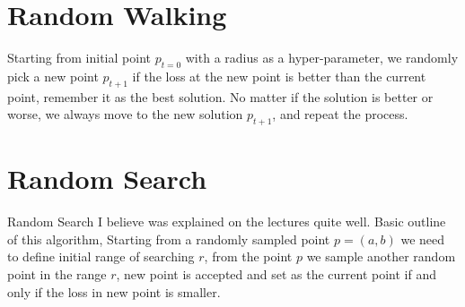 \documentclass{article}
\begin{document}
    \break


    \section{Random Walking}

    Starting from initial point $p_{t=0}$ with a radius as a hyper-parameter, we randomly pick a new point $p_{t+1}$ if the loss at the new point is better than the current point, remember it as the best solution.
    No matter if the solution is better or worse, we always move to the new solution $p_{t+1}$, and repeat the process.


    \section{Random Search}

    Random Search I believe was explained on the lectures quite well.
    Basic outline of this algorithm, Starting from a randomly sampled point $p = (a, b)$ we need to define initial range of searching $r$, from the point $p$ we sample another random point in the range $r$, new point is accepted and set as the current point if and only if the loss in new point is smaller.
\end{document}
